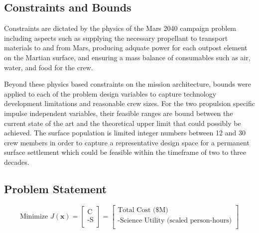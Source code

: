 \documentclass[]{aiaa-pretty}
\begin{document}
\subsection{Constraints and Bounds}
\label{sec:constraints}
Constraints are dictated by the physics of the Mars 2040 campaign problem including aspects such as supplying the necessary propellant to transport materials to and from Mars, producing adquate power for each outpost element on the Martian surface, and ensuring a mass balance of consumables such as air, water, and food for the crew. 

Beyond these physics based constraints on the mission architecture, bounds were applied to each of the problem design variables to capture technology development limitations and reasonable crew sizes. For the two propulsion specific impulse independent variables, their feasible ranges are bound between the current state of the art and the theoretical upper limit that could possibly be achieved. The surface population is limited integer numbers between 12 and 30 crew members in order to capture a representative design space for a permanent surface settlement which could be feasible within the timeframe of two to three decades.

\subsection{Problem Statement}
\label{sec:problemstatement}
\begin{equation*}
\mbox{Minimize } J(\mathbf{x})
=
\begin{bmatrix}
\mbox{C}\\
\mbox{-S}\\
\end{bmatrix}
=
\begin{bmatrix}
\mbox{Total Cost (\$M)}\\
\mbox{-Science Utility (scaled person-hours)}\\
\end{bmatrix}
\end{equation*}
\end{document}
